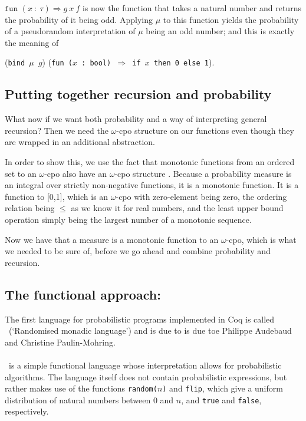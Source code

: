 \documentclass[11pt, leqno, titlepage]{article}
\theoremstyle{definition}
\begin{document}
$\texttt{fun }(x~:~\tau)\Rightarrow g~x~f$ is now the function that takes a natural
number and returns the probability of it being odd. Applying $\mu$ to this function
yields the probability of a pseudorandom interpretation of $\mu$ being an odd
number; and this is exactly the meaning of

(\texttt{bind $\mu$ $g$}) (\texttt{fun
  ($x$ : bool) $\Rightarrow$ if $x$ then 0 else 1}).

\subsection{Putting together recursion and probability}
\label{sec:prob-rec}
What now if we want both probability and a way of interpreting general recursion?
Then we need the $\omega$-cpo structure on our functions even though they are wrapped
in an additional abstraction.

In order to show this, we use the fact that monotonic functions from an ordered set
to an $\omega$-cpo also have an $\omega$-cpo structure \cite[p.~584]{rml-paper}.
Because a probability measure is an integral over strictly non-negative functions, it
is a monotonic function. It is a function to [0,1], which is an $\omega$-cpo with
zero-element being zero, the ordering relation being $\le$ as we know it for real
numbers, and the least upper bound operation simply being the largest number of a
monotonic sequence.

Now we have that a measure is a monotonic function to an $\omega$-cpo, which is
what we needed to be sure of, before we go ahead and combine probability and
recursion. 


\subsection{The functional approach: \rml}\label{sec:rml}
The first language for probabilistic programs implemented in Coq is called \rml\ 
(`Randomised monadic language') and is due to is due toe Philippe Audebaud and
Christine Paulin-Mohring\cite{rml-paper}.
\\ \\
\rml\ is a simple functional language whose interpretation allows for probabilistic
algorithms. The language itself does not contain probabilistic expressions, but
rather makes use of the functions \texttt{random($n$)} and \texttt{flip}, which give
a uniform distribution of natural numbers between 0 and $n$, and \texttt{true} and
\texttt{false}, respectively.
\end{document}
